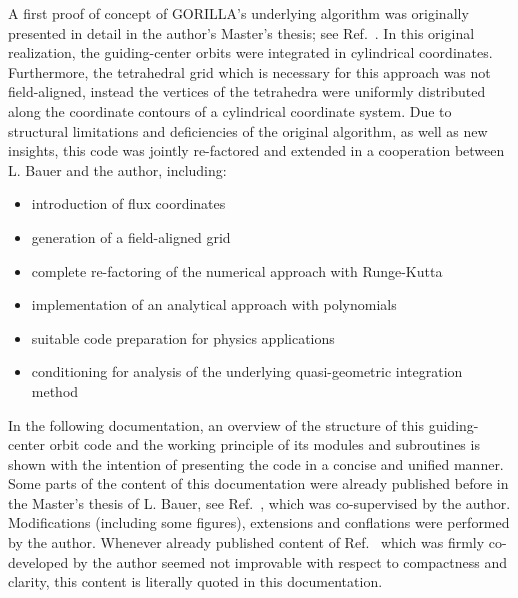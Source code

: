 \documentclass{TheMartianReport}
\begin{document}
A first proof of concept of GORILLA's underlying algorithm was originally presented in detail in the author's Master's thesis; see Ref.~. In this original realization, the guiding-center orbits were integrated in cylindrical coordinates. Furthermore, the tetrahedral grid which is necessary for this approach was not field-aligned, instead the vertices of the tetrahedra were uniformly distributed along the coordinate contours of a cylindrical coordinate system. Due to structural limitations and deficiencies of the original algorithm, as well as new insights, this code was jointly re-factored and extended in a cooperation between L. Bauer and the author, including:
\begin{itemize}
\item introduction of flux coordinates
\item generation of a field-aligned grid
\item complete re-factoring of the numerical approach with Runge-Kutta
\item implementation of an analytical approach with polynomials
\item suitable code preparation for physics applications
\item conditioning for analysis of the underlying quasi-geometric integration method\\
\end{itemize}


In the following documentation,  an overview of the structure of this guiding-center orbit code and the working principle of its modules and subroutines is shown with the intention of presenting the code in a concise and unified manner. Some parts of the content of this documentation were already published before in the Master's thesis of L. Bauer, see Ref.~, which was co-supervised by the author. Modifications (including some figures), extensions and conflations were performed by the author. Whenever already published content of Ref.~ which was firmly co-developed by the author seemed not improvable with respect to compactness and clarity, this content is literally quoted in this documentation.
\end{document}
